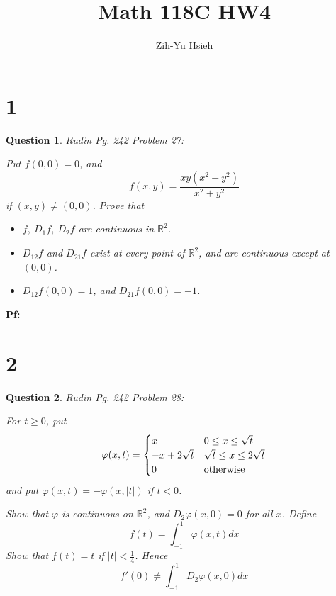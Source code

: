 \documentclass{article}
\title{Math 118C HW4}
\author{Zih-Yu Hsieh}
\newtheorem{question}{Question}
\begin{document}
\maketitle

\section*{1}
\begin{myBox}[]{}
    \begin{question}
        Rudin Pg. 242 Problem 27:

        Put $f(0,0)=0$, and 
        $$f(x,y)=\frac{xy(x^2-y^2)}{x^2+y^2}$$
        if $(x,y)\neq (0,0)$. Prove that 
        \begin{itemize}
            \item[(a)] $f,\ D_1f,\ D_2f$ are continuous in $\mathbb{R}^2$.
            \item[(b)] $D_{12}f$ and $D_{21}f$ exist at every point of $\mathbb{R}^2$, and are continuous except at $(0,0)$.
            \item[(c)] $D_{12}f(0,0)=1$, and $D_{21}f(0,0)=-1$.  
        \end{itemize}
    \end{question}
\end{myBox}

\textbf{Pf:}

\break

\section*{2}
\begin{myBox}[]{}
    \begin{question}
        Rudin Pg. 242 Problem 28:

        For $t\geq 0$, put 
        $$\varphi(x,t)=\begin{cases}
            x & 0\leq x\leq \sqrt{t}\\
            -x+2\sqrt{t} & \sqrt{t}\leq x\leq 2\sqrt{t}\\
            0 & \textmd{otherwise}
        \end{cases}$$
        and put $\varphi(x,t)=-\varphi(x,|t|)$ if $t<0$.

        Show that $\varphi$ is continuous on $\mathbb{R}^2$, and $D_2\varphi(x,0)=0$ for all $x$. Define 
        $$f(t)=\int_{-1}^{1}\varphi(x,t)dx$$
        Show that $f(t)=t$ if $|t|<\frac{1}{4}$. Hence 
        $$f'(0)\neq \int_{-1}^{1}D_2\varphi(x,0)dx$$
    \end{question}
\end{myBox}
\end{document}
